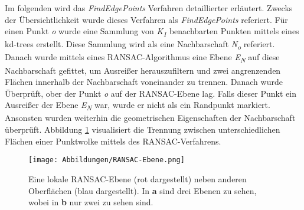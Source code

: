 Im folgenden wird das \textit{FindEdgePoints} Verfahren detaillierter erläutert. Zwecks der Übersichtlichkeit wurde dieses Verfahren als \textit{FindEdgePoints} referiert. Für einen Punkt \textit{o} wurde eine Sammlung von \textit{K\textsubscript{1}} benachbarten Punkten mittels eines kd-trees erstellt. Diese Sammlung wird als eine Nachbarschaft \textit{N\textsubscript{o}} referiert. Danach wurde mittels eines RANSAC-Algorithmus eine Ebene \textit{E\textsubscript{N}} auf diese Nachbarschaft gefittet, um Ausreißer herauszufiltern und zwei angrenzenden Flächen innerhalb der Nachbarschaft voneinander zu trennen. Danach wurde Überprüft, ober der Punkt \textit{o} auf der RANSAC-Ebene lag. Falls dieser Punkt ein Ausreißer der Ebene \textit{E\textsubscript{N}} war, wurde er nicht als ein Randpunkt markiert. Ansonsten wurden weiterhin die geometrischen Eigenschaften der Nachbarschaft überprüft. Abbildung \ref{RANSAC-Ebene} visualisiert die Trennung zwischen unterschiedlichen Flächen einer Punktwolke mittels des RANSAC-Verfahrens. 

\begin{figure}[h]
	\texttt{[image: Abbildungen/RANSAC-Ebene.png]}
	\centering
	\caption{Eine lokale RANSAC-Ebene (rot dargestellt) neben anderen Oberflächen (blau dargestellt). In \textbf{a} sind drei Ebenen zu sehen, wobei in \textbf{b} nur zwei zu sehen sind. \autocite{ni_edge_2016}}
	\label{RANSAC-Ebene}
\end{figure} 

